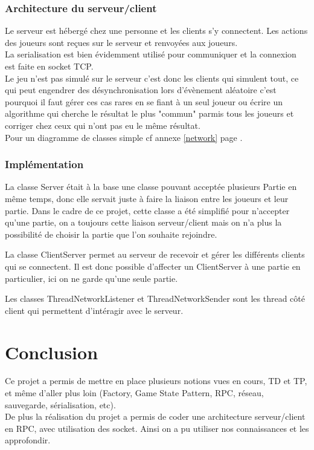 \documentclass{report}
\begin{document}
\subsection{Architecture du serveur/client}
Le serveur est hébergé chez une personne et les clients s'y connectent. Les actions des joueurs sont reçues sur le serveur et renvoyées aux joueurs.\\
La serialisation est bien évidemment utilisé pour communiquer et la connexion est faite en socket TCP.\\
Le jeu n'est pas simulé sur le serveur c'est donc les clients qui simulent tout, ce qui peut engendrer des désynchronisation lors d'évènement aléatoire c'est pourquoi il faut gérer ces cas rares en se fiant à un seul joueur ou écrire un algorithme qui cherche le résultat le plus "commun" parmis tous les joueurs et corriger chez ceux qui n'ont pas eu le même résultat.\\
Pour un diagramme de classes simple cf annexe \ref{network} page \pageref{network}.

\subsection{Implémentation}
La classe Server était à la base une classe pouvant acceptée plusieurs Partie en même temps, donc elle servait juste à faire la liaison entre les joueurs et leur partie. Dans le cadre de ce projet, cette classe a été simplifié pour n'accepter qu'une partie, on a toujours cette liaison serveur/client mais on n'a plus la possibilité de choisir la partie que l'on souhaite rejoindre.


La classe ClientServer permet au serveur de recevoir et gérer les différents clients qui se connectent. Il est donc possible d'affecter un ClientServer à une partie en particulier, ici on ne garde qu'une seule partie.


Les classes ThreadNetworkListener et ThreadNetworkSender sont les thread côté client qui permettent d'intéragir avec le serveur.
\chapter{Conclusion}
Ce projet a permis de mettre en place plusieurs notions vues en cours, TD et TP, et même d'aller plus loin (Factory, Game State Pattern, RPC, réseau, sauvegarde, sérialisation, etc).\\
De plus la réalisation du projet a permis de coder une architecture serveur/client en RPC, avec utilisation des socket. Ainsi on a pu utiliser nos connaissances et les approfondir.\\
\end{document}
